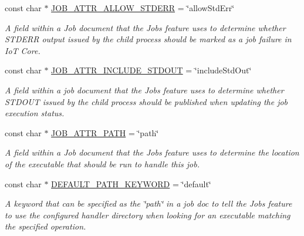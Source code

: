 \begin{DoxyCompactItemize}
const char $\ast$ \hyperlink{class_aws_1_1_iot_1_1_device_client_1_1_jobs_1_1_jobs_feature_afd50429795fa66c3986132ca98f3d209}{J\+O\+B\+\_\+\+A\+T\+T\+R\+\_\+\+A\+L\+L\+O\+W\+\_\+\+S\+T\+D\+E\+RR} = \char`\"{}allow\+Std\+Err\char`\"{}
\begin{DoxyCompactList}\small\item\em A field within a Job document that the Jobs feature uses to determine whether S\+T\+D\+E\+RR output issued by the child process should be marked as a job failure in IoT Core. \end{DoxyCompactList}\item 
\mbox{\label{class_aws_1_1_iot_1_1_device_client_1_1_jobs_1_1_jobs_feature_af3faf0824c3b40e078452642ae53ff0e}} 
const char $\ast$ \hyperlink{class_aws_1_1_iot_1_1_device_client_1_1_jobs_1_1_jobs_feature_af3faf0824c3b40e078452642ae53ff0e}{J\+O\+B\+\_\+\+A\+T\+T\+R\+\_\+\+I\+N\+C\+L\+U\+D\+E\+\_\+\+S\+T\+D\+O\+UT} = \char`\"{}include\+Std\+Out\char`\"{}
\begin{DoxyCompactList}\small\item\em A field within a job document that the Jobs feature uses to determine whether S\+T\+D\+O\+UT issued by the child process should be published when updating the job execution status. \end{DoxyCompactList}\item 
const char $\ast$ \hyperlink{class_aws_1_1_iot_1_1_device_client_1_1_jobs_1_1_jobs_feature_a7cb8aaf7a89223ff69bfa6752f35d7b3}{J\+O\+B\+\_\+\+A\+T\+T\+R\+\_\+\+P\+A\+TH} = \char`\"{}path\char`\"{}
\begin{DoxyCompactList}\small\item\em A field within a Job document that the Jobs feature uses to determine the location of the executable that should be run to handle this job. \end{DoxyCompactList}\item 
\mbox{\label{class_aws_1_1_iot_1_1_device_client_1_1_jobs_1_1_jobs_feature_ac840150bd4fe9cfe959ce742a15c2b15}} 
const char $\ast$ \hyperlink{class_aws_1_1_iot_1_1_device_client_1_1_jobs_1_1_jobs_feature_ac840150bd4fe9cfe959ce742a15c2b15}{D\+E\+F\+A\+U\+L\+T\+\_\+\+P\+A\+T\+H\+\_\+\+K\+E\+Y\+W\+O\+RD} = \char`\"{}default\char`\"{}
\begin{DoxyCompactList}\small\item\em A keyword that can be specified as the \char`\"{}path\char`\"{} in a job doc to tell the Jobs feature to use the configured handler directory when looking for an executable matching the specified operation. \end{DoxyCompactList}\item 

\end{DoxyCompactItemize}
